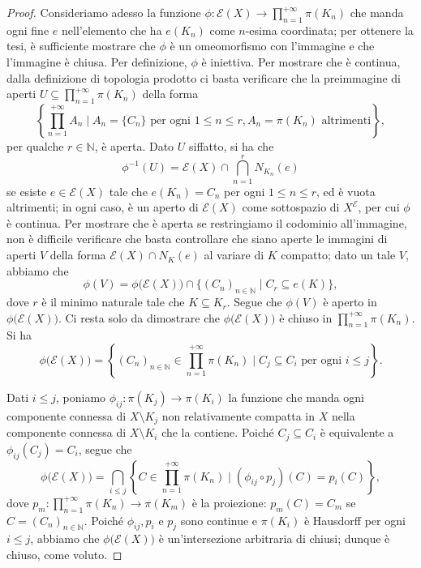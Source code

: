 \begin{proof}
    Consideriamo adesso la funzione $\phi:\mathcal{E}(X)\longrightarrow \displaystyle\prod_{n=1}^{+\infty}\pi(K_n)$ che manda ogni fine $e$ nell'elemento che ha $e(K_n)$ come $n$-esima coordinata; per ottenere la tesi, è sufficiente mostrare che $\phi$ è un omeomorfismo con l'immagine e che l'immagine è chiusa. Per definizione, $\phi$ è iniettiva. Per mostrare che è continua, dalla definizione di topologia prodotto ci basta verificare che la preimmagine di aperti $U\subseteq \displaystyle\prod_{n=1}^{+\infty}\pi(K_n)$ della forma
    $$\left\{\prod_{n=1}^{+\infty}A_n\mid A_n=\{C_n\}\text{ per ogni }1\le n\le r, A_n=\pi(K_n)\text{ altrimenti}\right\},$$
    per qualche $r\in\mathbb{N}$, è aperta. Dato $U$ siffatto, si ha che
    $$\phi^{-1}(U)=\mathcal{E}(X)\cap\bigcap_{n=1}^r N_{K_n}(e)$$
    se esiste $e\in\mathcal{E}(X)$ tale che $e(K_n)=C_n$ per ogni $1\le n\le r$, ed è vuota altrimenti; in ogni caso, è un aperto di $\mathcal{E}(X)$ come sottospazio di $X^\mathcal{E}$, per cui $\phi$ è continua. Per mostrare che è aperta se restringiamo il codominio all'immagine, non è difficile verificare che basta controllare che siano aperte le immagini di aperti $V$ della forma $\mathcal{E}(X)\cap N_K(e)$ al variare di $K$ compatto; dato un tale $V$, abbiamo che
    $$\phi(V)=\phi\big(\mathcal{E}(X)\big)\cap \{(C_n)_{n\in\mathbb{N}} \mid C_r \subseteq e(K)\},$$
    dove $r$ è il minimo naturale tale che $K\subseteq K_r$. Segue che $\phi(V)$ è aperto in $\phi\big(\mathcal{E}(X)\big)$. Ci resta solo da dimostrare che $\phi\big(\mathcal{E}(X)\big)$ è chiuso in $\displaystyle\prod_{n=1}^{+\infty}\pi(K_n)$. Si ha
    $$\phi\big(\mathcal{E}(X)\big)=\left\{(C_n)_{n\in\mathbb{N}}\in\prod_{n=1}^{+\infty}\pi(K_n)\mid C_j\subseteq C_i\text{ per ogni }i\le j\right\}.$$

    Dati $i\le j$, poniamo $\phi_{ij}:\pi(K_j)\longrightarrow\pi(K_i)$ la funzione che manda ogni componente connessa di $X\setminus K_j$ non relativamente compatta in $X$ nella componente connessa di $X\setminus K_i$ che la contiene. Poiché $C_j\subseteq C_i$ è equivalente a $\phi_{ij}(C_j)=C_i$, segue che
    $$\phi\big(\mathcal{E}(X)\big)=\bigcap_{i\le j}\left\{C\in\prod_{n=1}^{+\infty}\pi(K_n) \mid (\phi_{ij}\circ p_j)(C)=p_i(C)\right\},$$
    dove $p_m:\displaystyle\prod_{n=1}^{+\infty}\pi(K_n)\longrightarrow \pi(K_m)$ è la proiezione: $p_m(C)=C_m$ se $C=(C_n)_{n\in\mathbb{N}}$. Poiché $\phi_{ij}, p_i$ e $p_j$ sono continue e $\pi(K_i)$ è Hausdorff per ogni $i\le j$, abbiamo che $\phi\big(\mathcal{E}(X)\big)$ è un'intersezione arbitraria di chiusi; dunque è chiuso, come voluto.
\end{proof}

